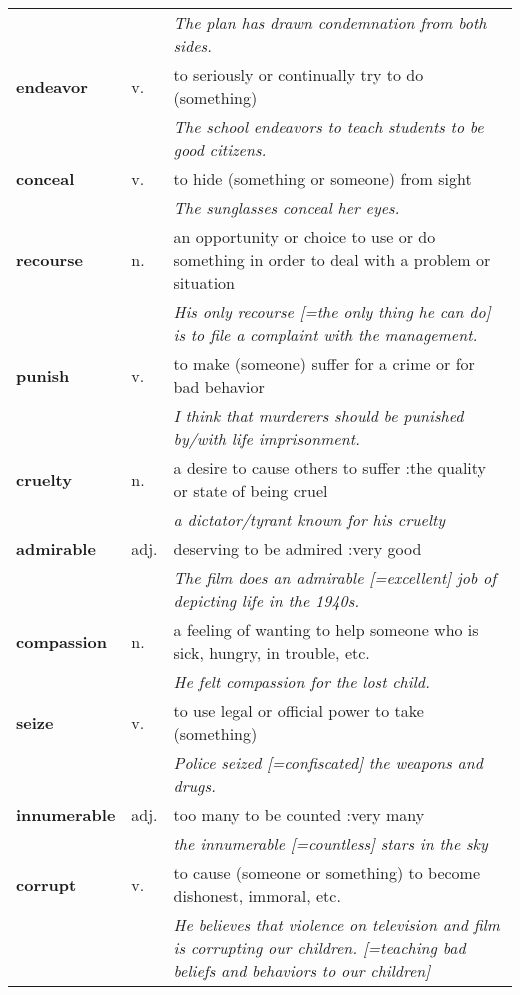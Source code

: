 \documentclass[a4paper]{article}
\begin{document}
\begin{longtable}{llp{11cm}}
 & & \textit{The plan has drawn condemnation from both sides.}\\[0.08cm]
\textbf{endeavor} & v. &  to seriously or continually try to do (something) \\
 & & \textit{The school endeavors to teach students to be good citizens.}\\[0.08cm]
\textbf{conceal} & v. &  to hide (something or someone) from sight \\
 & & \textit{The sunglasses conceal her eyes.}\\[0.08cm]
\textbf{recourse} & n. &  an opportunity or choice to use or do something in order to deal with a problem or situation \\
 & & \textit{His only recourse [=the only thing he can do] is to file a complaint with the management.}\\[0.08cm]
\textbf{punish} & v. &  to make (someone) suffer for a crime or for bad behavior \\
 & & \textit{I think that murderers should be punished by/with life imprisonment.}\\[0.08cm]
\textbf{cruelty} & n. &  a desire to cause others to suffer :the quality or state of being cruel \\
 & & \textit{a dictator/tyrant known for his cruelty}\\[0.08cm]
\textbf{admirable} & adj. &  deserving to be admired :very good \\
 & & \textit{The film does an admirable [=excellent] job of depicting life in the 1940s.}\\[0.08cm]
\textbf{compassion} & n. &  a feeling of wanting to help someone who is sick, hungry, in trouble, etc. \\
 & & \textit{He felt compassion for the lost child.}\\[0.08cm]
\textbf{seize} & v. &  to use legal or official power to take (something) \\
 & & \textit{Police seized [=confiscated] the weapons and drugs.}\\[0.08cm]
\textbf{innumerable} & adj. &  too many to be counted :very many \\
 & & \textit{the innumerable [=countless] stars in the sky}\\[0.08cm]
\textbf{corrupt} & v. &  to cause (someone or something) to become dishonest, immoral, etc. \\
 & & \textit{He believes that violence on television and film is corrupting our children. [=teaching bad beliefs and behaviors to our children]}\\[0.08cm]
\end{longtable}
\end{document}
